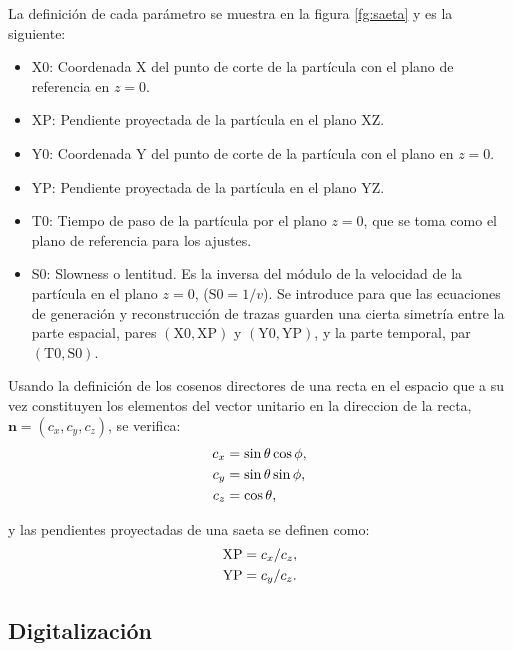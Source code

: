 \documentclass[a4paper]{article}
\let\vec\mathbf  %
\begin{document}
La definición de cada parámetro se muestra en la figura \ref{fg:saeta}  y es la siguiente:

\begin{itemize}
    \item X0:  Coordenada X del punto de corte de la partícula con el plano de referencia en $z=0$.
    \item XP:  Pendiente proyectada de la partícula en el plano XZ.
    \item Y0:  Coordenada Y del punto de corte de la partícula con el plano en $z=0$.
    \item YP:  Pendiente proyectada de la partícula en el plano YZ.
    \item T0:  Tiempo de paso de la partícula por el plano $z=0$, que se toma como el plano de referencia para los ajustes.
    \item S0:  Slowness o lentitud. Es la inversa del módulo de la velocidad de la partícula en el plano $z=0$,   ($\mathrm{S0} = 1/v$). Se introduce para que las ecuaciones de generación y reconstrucción de trazas guarden una cierta simetría entre la parte espacial, pares $(\mathrm{X0}, \mathrm{XP})$ y $(\mathrm{Y0}, \mathrm{YP})$, y la parte temporal, par $(\mathrm{T0}, \mathrm{S0})$. 
\end{itemize}
    
Usando la definición de los cosenos directores de una recta en el espacio que a su vez constituyen los elementos del vector unitario  en la direccion de la recta, $\vec{n} = (c_x, c_y, c_z)$, se verifica: 
\begin{align}
    \notag
    c_x & = \sin \theta \cos \phi, \\
    c_y & = \sin \theta \sin \phi, \\
    \notag
    c_z & = \cos \theta,
\end{align}

y las pendientes proyectadas de una saeta se definen como:
\begin{align}
    \notag
    \mathrm{XP}& = c_x / c_z, \\
    \mathrm{YP}& = c_y / c_z.
    \label{eq:proj}
\end{align}


\subsection{Digitalización}
\end{document}
